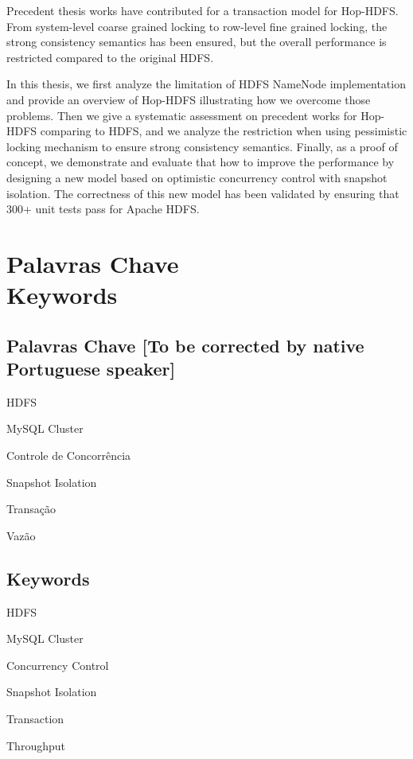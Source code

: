 \noindent Precedent thesis works have contributed for a transaction model for Hop-HDFS. From system-level coarse grained locking to row-level fine grained locking, the strong consistency semantics has been ensured, but the overall performance is restricted compared to the original HDFS.

\noindent In this thesis, we first analyze the limitation of HDFS NameNode  implementation and provide an overview of Hop-HDFS illustrating how we overcome those problems. Then we give a systematic assessment on precedent works for Hop-HDFS comparing to HDFS, and we analyze the restriction when using pessimistic locking mechanism to ensure strong consistency semantics. Finally, as a proof of concept, we demonstrate and evaluate that how to improve the performance by designing a new model based on optimistic concurrency control with snapshot isolation. The correctness of this new model has been validated by ensuring that 300+ unit tests pass for Apache HDFS.

\newpage


\chapter*{Palavras Chave \\ Keywords}
\thispagestyle{empty}

\section*{Palavras Chave [To be corrected by native Portuguese speaker]}
{\large %

\noindent HDFS

\noindent MySQL Cluster

\noindent Controle de Concorrência

\noindent Snapshot Isolation

\noindent Transação

\noindent Vazão

}

\section*{Keywords}

{\large %

\noindent HDFS

\noindent MySQL Cluster

\noindent Concurrency Control

\noindent Snapshot Isolation

\noindent Transaction

\noindent Throughput

}

